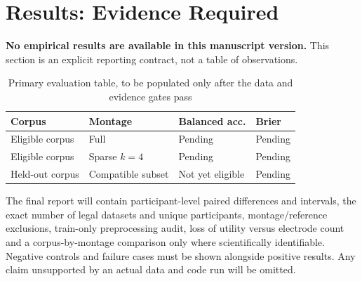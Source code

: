 \section{Results: Evidence Required}
\textbf{No empirical results are available in this manuscript version.} This section is an explicit reporting contract, not a table of observations.

\begin{table}[htbp]
\caption{Primary evaluation table, to be populated only after the data and evidence gates pass}
\centering
\begin{tabular}{llll}
\toprule
Corpus & Montage & Balanced acc. & Brier \\
\midrule
Eligible corpus & Full & Pending & Pending\\
Eligible corpus & Sparse $k=4$ & Pending & Pending\\
Held-out corpus & Compatible subset & Not yet eligible & Pending\\
\bottomrule
\end{tabular}
\end{table}

The final report will contain participant-level paired differences and intervals, the exact number of legal datasets and unique participants, montage/reference exclusions, train-only preprocessing audit, loss of utility versus electrode count and a corpus-by-montage comparison only where scientifically identifiable. Negative controls and failure cases must be shown alongside positive results. Any claim unsupported by an actual data and code run will be omitted.
